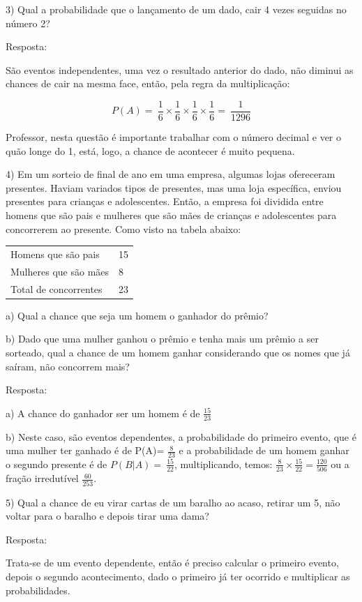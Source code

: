 {{{{{{{{{{{{{3) Qual a probabilidade que o lançamento de um dado, cair 4 vezes
seguidas no número 2?

Resposta:

São eventos independentes, uma vez o resultado anterior do dado, não
diminui as chances de cair na mesma face, então, pela regra da
multiplicação:

\[P(A) = \ \frac{1}{6} \times \frac{1}{6} \times \frac{1}{6} \times \frac{1}{6} = \ \frac{1}{1296}\]

Professor, nesta questão é importante trabalhar com o número decimal e
ver o quão longe do 1, está, logo, a chance de acontecer é muito
pequena.

4) Em um sorteio de final de ano em uma empresa, algumas lojas
ofereceram presentes. Haviam variados tipos de presentes, mas uma loja
específica, enviou presentes para crianças e adolescentes. Então, a
empresa foi dividida entre homens que são pais e mulheres que são mães
de crianças e adolescentes para concorrerem ao presente. Como visto na
tabela abaixo:

\begin{longtable}[]{@{}ll@{}}
\toprule
\endhead
Homens que são pais & 15\tabularnewline
Mulheres que são mães & 8\tabularnewline
Total de concorrentes & 23\tabularnewline
\bottomrule
\end{longtable}

a) Qual a chance que seja um homem o ganhador do prêmio?

b) Dado que uma mulher ganhou o prêmio e tenha mais um prêmio a ser
sorteado, qual a chance de um homem ganhar considerando que os nomes que
já saíram, não concorrem mais?

Resposta:

a) A chance do ganhador ser um homem é de \(\frac{15}{23}\)

b) Neste caso, são eventos dependentes, a probabilidade do primeiro
evento, que é uma mulher ter ganhado é de P(A)= \(\frac{8}{23}\) e a
probabilidade de um homem ganhar o segundo presente é de
\(P(B|A) = \ \frac{15}{22}\), multiplicando, temos:
\(\frac{8}{23} \times \frac{15}{22} = \frac{120}{506}\) ou a fração
irredutível \(\frac{60}{253}.\)

5) Qual a chance de eu virar cartas de um baralho ao acaso, retirar um
5, não voltar para o baralho e depois tirar uma dama?

Resposta:

Trata-se de um evento dependente, então é preciso calcular o primeiro
evento, depois o segundo acontecimento, dado o primeiro já ter ocorrido
e multiplicar as probabilidades.

}}}}}}}}}}}}}
